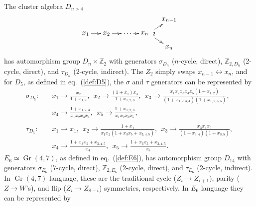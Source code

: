 \documentclass[11pt]{article}
\DeclareMathOperator{\Gr}{Gr}
\begin{document}
The cluster algebra $D_{n>4}$
\begin{equation}
    \begin{gathered}
    \begin{xy} 0;<1pt,0pt>:<0pt,-1pt>::
      (0,20) *+{x_1} ="1",
      (30,20) *+{x_2} ="2",
      (60,20) *+{\ldots} ="3",
      (90,20) *+{x_{n-2}} ="4",
      (120,0) *+{x_{n-1}} ="5",
      (120,40) *+{x_{n}} ="6",
      "1", {\ar"2"},
      "2", {\ar"3"},
      "3", {\ar"4"},
      "4", {\ar"5"},
      "4", {\ar"6"},
    \end{xy}
    \end{gathered}
\end{equation}
has automorphism group $D_n \times \mathbb{Z}_2$ with generators $\sigma_{D_n}$ ($n$-cycle, direct), $\mathbb{Z}_{2,D_n}$ (2-cycle, direct), and $\tau_{D_n}$ (2-cycle, indirect). The $Z_2$ simply swaps $x_{n-1} \leftrightarrow x_n$, and for $D_5$, as defined in eq.~(\ref{def:D5}), the $\sigma$ and $\tau$ generators can be represented by
\begin{equation}
\begin{split}
  \sigma_{D_5}:\quad& 
    x_1\to \frac{x_2}{1+x_{1,2}},~~
    x_2\to \frac{(1+x_1) x_3}{1+x_{1,2,3}},~~
    x_3\to \frac{x_1 x_2 x_3 x_4 x_5 (1+x_{1,2})}{(1+x_{1,2,3,4}) (1+x_{1,2,3,5})},\\&
    x_4\to \frac{1+x_{1,2,3}}{x_1 x_2 x_3 x_4},~~
    x_5\to \frac{1+x_{1,2,3}}{x_1 x_2 x_3 x_5},\\ \\
  \tau_{D_5}:\quad& 
    x_1\to x_1,~~
    x_2\to \frac{1+x_1}{x_1 x_2 (1+x_3 x_5+x_{3,4,5})},~~
    x_3\to \frac{x_3 x_4 x_5}{(1+x_{3,4}) (1+x_{3,5})},\\&
    x_4\to \frac{1+x_3 x_5+x_{3,4,5}}{x_4},~~
    x_5\to \frac{1+x_3 x_5+x_{3,4,5}}{x_5}.
\end{split}  
\end{equation}
$E_6 \simeq \Gr(4,7)$, as defined in eq.~(\ref{def:E6}), has automorphism group $D_{14}$ with generators $\sigma_{E_6}$ (7-cycle, direct), $\mathbb{Z}_{2,E_6}$ (2-cycle, direct), and $\tau_{E_6}$ (2-cycle, indirect). In $\Gr(4,7)$ language, these are the traditional cycle ($Z_i \to Z_{i+1}$), parity ($Z \to W$'s), and flip ($Z_i \to Z_{8-i}$) symmetries, respectively. In $E_6$ language they can be represented by 
\end{document}
